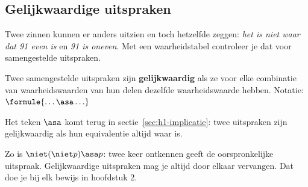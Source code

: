 
\begin{oefeningen}
\end{oefeningen}

\subsection{Gelijkwaardige uitspraken}

Twee zinnen kunnen er anders uitzien en toch hetzelfde zeggen: \textit{het is niet waar dat 91 even is} en \textit{91 is oneven}. Met een waarheidstabel controleer je dat voor samengestelde uitspraken.

\begin{theorie}
Twee samengestelde uitspraken zijn \textbf{\textcolor{accent}{gelijkwaardig}} als ze voor elke combinatie van waarheidswaarden van hun delen dezelfde waarheidswaarde hebben. Notatie: $\formule{\ldots \asa \ldots}$
\end{theorie}

Het teken $\asa$ komt terug in sectie~\ref{sec:h1-implicatie}: twee uitspraken zijn gelijkwaardig als hun equivalentie altijd waar is.

Zo is $\niet(\niet p) \asa p$: twee keer ontkennen geeft de oorspronkelijke uitspraak. Gelijkwaardige uitspraken mag je altijd door elkaar vervangen. Dat doe je bij elk bewijs in hoofdstuk 2.

